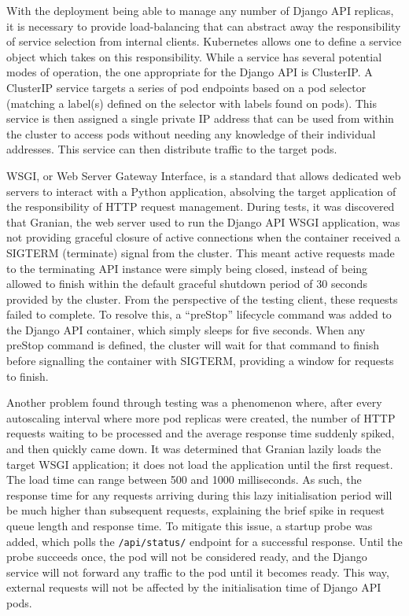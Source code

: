 With the deployment being able to manage any number of Django API replicas, it is necessary to provide load-balancing that can abstract away the responsibility of service selection from internal clients. Kubernetes allows one to define a service object which takes on this responsibility. While a service has several potential modes of operation, the one appropriate for the Django API is ClusterIP. A ClusterIP service targets a series of pod endpoints based on a pod selector (matching a label(s) defined on the selector with labels found on pods). This service is then assigned a single private IP address that can be used from within the cluster to access pods without needing any knowledge of their individual addresses. This service can then distribute traffic to the target pods.

WSGI, or Web Server Gateway Interface, is a standard that allows dedicated web servers to interact with a Python application, absolving the target application of the responsibility of HTTP request management. During tests, it was discovered that Granian, the web server used to run the Django API WSGI application, was not providing graceful closure of active connections when the container received a SIGTERM (terminate) signal from the cluster. This meant active requests made to the terminating API instance were simply being closed, instead of being allowed to finish within the default graceful shutdown period of 30 seconds provided by the cluster. From the perspective of the testing client, these requests failed to complete. To resolve this, a ``preStop'' lifecycle command was added to the Django API container, which simply sleeps for five seconds. When any preStop command is defined, the cluster will wait for that command to finish before signalling the container with SIGTERM, providing a window for requests to finish.

Another problem found through testing was a phenomenon where, after every autoscaling interval where more pod replicas were created, the number of HTTP requests waiting to be processed and the average response time suddenly spiked, and then quickly came down. It was determined that Granian lazily loads the target WSGI application; it does not load the application until the first request. The load time can range between 500 and 1000 milliseconds. As such, the response time for any requests arriving during this lazy initialisation period will be much higher than subsequent requests, explaining the brief spike in request queue length and response time. To mitigate this issue, a startup probe was added, which polls the \verb|/api/status/| endpoint for a successful response. Until the probe succeeds once, the pod will not be considered ready, and the Django service will not forward any traffic to the pod until it becomes ready. This way, external requests will not be affected by the initialisation time of Django API pods.

